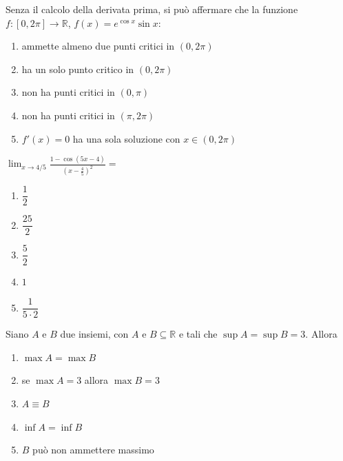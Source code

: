 \begin{quiz}
Senza il calcolo della derivata prima, si pu\`o affermare che la funzione $f:[0,2\pi]\to\mathbb R$, $f(x)=e^{\cos x}\sin x$:
\begin{enumerate}
\item ammette almeno due punti critici in $(0,2\pi)$
\item ha un solo punto critico in $(0,2\pi)$
\item non ha punti critici in $(0,\pi)$
\item non ha punti critici in $(\pi,2\pi)$
\item $f'(x)=0$ ha una sola soluzione con $x\in(0,2\pi)$
\end{enumerate}
\end{quiz}

\begin{quiz}
$\displaystyle\lim_{x\to4/5}\frac{1-\cos(5x-4)}{(x-\frac45)^2}=$
\begin{enumerate}
\item $\dfrac12$
\item $\dfrac{25}{2}$
\item $\dfrac52$
\item $1$
\item $\dfrac1{5\cdot2}$
\end{enumerate}
\end{quiz}

\begin{quiz}
Siano $A$ e $B$ due insiemi, con $A$ e $B\subseteq\mathbb R$ e tali che $\sup A=\sup B=3$. Allora
\begin{enumerate}
\item $\max A=\max B$
\item se $\max A=3$ allora $\max B=3$
\item $A\equiv B$
\item $\inf A=\inf B$
\item $B$ pu\`o non ammettere massimo
\end{enumerate}
\end{quiz}

